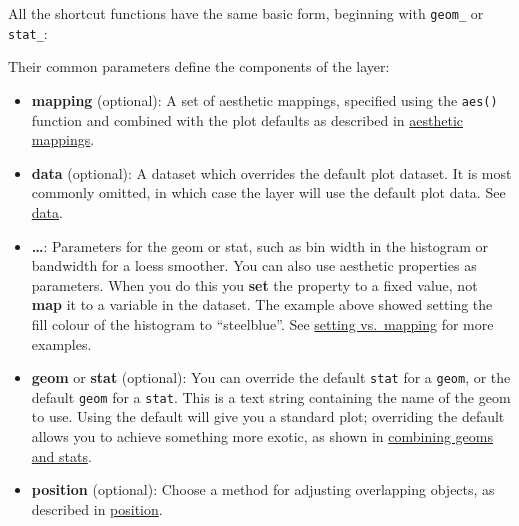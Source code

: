 \begin{Shaded}
\begin{Highlighting}[]
\NormalTok{(} \NormalTok{, } \NormalTok{)}
\end{Highlighting}
\end{Shaded}

All the shortcut functions have the same basic form, beginning with
\texttt{geom\_} or \texttt{stat\_}:

\begin{Shaded}
\begin{Highlighting}[]
\end{Highlighting}
\end{Shaded}

Their common parameters define the components of the layer:

\begin{itemize}
\item
  \textbf{mapping} (optional): A set of aesthetic mappings, specified
  using the \texttt{aes()} function and combined with the plot defaults
  as described in \hyperref[sec:aes]{aesthetic mappings}.
\item
  \textbf{data} (optional): A dataset which overrides the default plot
  dataset. It is most commonly omitted, in which case the layer will use
  the default plot data. See \hyperref[sec:data]{data}.
\item
  \textbf{\ldots{}}: Parameters for the geom or stat, such as bin width
  in the histogram or bandwidth for a loess smoother. You can also use
  aesthetic properties as parameters. When you do this you \textbf{set}
  the property to a fixed value, not \textbf{map} it to a variable in
  the dataset. The example above showed setting the fill colour of the
  histogram to ``steelblue''. See \hyperref[sub:setting-mapping]{setting
  vs.~mapping} for more examples.
\item
  \textbf{geom} or \textbf{stat} (optional): You can override the
  default \texttt{stat} for a \texttt{geom}, or the default
  \texttt{geom} for a \texttt{stat}. This is a text string containing
  the name of the geom to use. Using the default will give you a
  standard plot; overriding the default allows you to achieve something
  more exotic, as shown in \hyperref[sub:new-plot-types]{combining geoms
  and stats}.
\item
  \textbf{position} (optional): Choose a method for adjusting
  overlapping objects, as described in
  \hyperref[sec:position]{position}.
\end{itemize}

